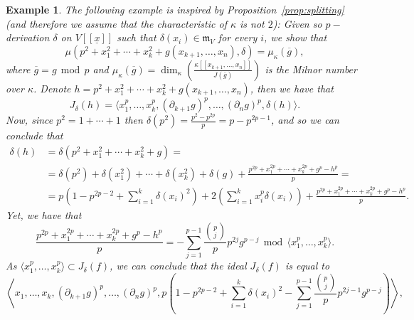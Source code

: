 \documentclass{article}
\newtheorem{example}[theorem]{Example}
\newcommand{\maxV}{\mathfrak{m}_V}
\newcommand{\Vx}{V[[\underline{x}]]}
\numberwithin{theorem}{section}
\renewcommand{\mod}{\,\operatorname{mod}\,}
\begin{document}
\begin{example}
    \textup{The following example is inspired by Proposition~\ref{prop:splitting} (and therefore we assume that the characteristic of $\kappa$ is not $2$): Given so $p-$derivation $\delta$ on $\Vx$ such that $\delta(x_i) \in \maxV$ for every $i$, we show that}
    \begin{equation*}
        \mu(p^2 +x_1^2 +\cdots +x_k^2+g(x_{k+1}, \dots, x_n), \delta)= \mu_\kappa(\overline{g}),
    \end{equation*}
    \noindent\textup{where $\overline{g} = g \mod p$ and $\mu_\kappa(\overline{g})=\dim_\kappa\left( \frac{\kappa [[x_{k+1}, \dots, x_n]]}{J(\overline{g})}\right)$ is the Milnor number over $\kappa$.  Denote $h=p^2 +x_1^2 +\cdots +x_k^2+g(x_{k+1}, \dots, x_n)$, then we have that }
    \begin{equation*}
        J_\delta(h) = \langle x_1^p, \dots, x_k^p, (\partial_{k+1} g)^p, \dots, (\partial_n g)^p, \delta(h) \rangle.
    \end{equation*}
    \textup{Now, since $p^2=1+\cdots +1$ then $\delta(p^2)=\frac{p^2 - p^{2p}}{p}=p-p^{2p-1}$, and so we can conclude that }
    \begin{equation*}
        \begin{split}
            \delta(h) &= \delta(p^2 +x_1^2 +\cdots +x_k^2+g)=\\
            &= \delta(p^2) + \delta(x_1^2)+  \cdots + \delta(x_k^2) + \delta(g) + \frac{p^{2p} +x_1^{2p} +\cdots +x_k^{2p}+g^p - h^p}{p}=\\
            &= p\left(1-p^{2p-2} + \sum_{i=1}^k \delta(x_i)^2\right) + 2\left(\sum_{i=1}^k x_i^p \delta(x_i)\right) + \frac{p^{2p} +x_1^{2p} +\cdots +x_k^{2p}+g^p - h^p}{p}.
        \end{split}
    \end{equation*}
    \textup{Yet, we have that
    \begin{equation*}
        \frac{p^{2p} +x_1^{2p} +\cdots +x_k^{2p}+g^p - h^p}{p} = -\sum_{j=1}^{p-1} \frac{\binom{p}{j}}{p} p^{2j} g^{p-j} \mod \langle x_1^p, \dots, x_k^p \rangle.
    \end{equation*}
    \noindent As $\langle x_1^p, \dots, x_k^p \rangle \subset J_\delta(f)$, we can conclude that the ideal $J_\delta(f)$ is equal to  }
    \begin{equation*}
        \left\langle x_1, \dots, x_k, (\partial_{k+1} g)^p, \dots, (\partial_n g)^p,  p\left(1-p^{2p-2} + \sum_{i=1}^k \delta(x_i)^2 -\sum_{j=1}^{p-1} \frac{\binom{p}{j}}{p} p^{2j-1} g^{p-j}\right) \right\rangle,

\end{equation*}
\end{example}
\end{document}
